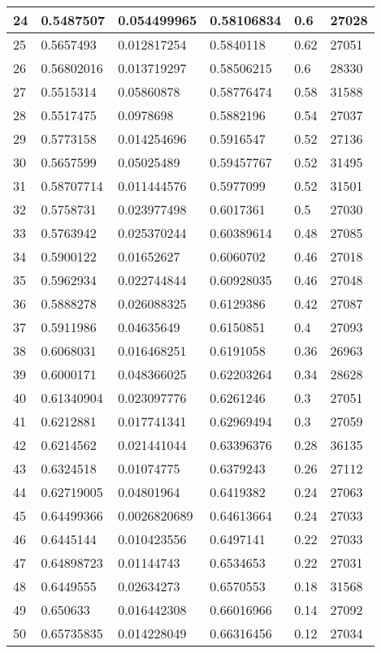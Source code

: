 \begin{longtable}{|l|l|l|l|l|l|}
24 & 0.5487507 & 0.054499965 & 0.58106834 & 0.6 & 27028 \\ \hline 
25 & 0.5657493 & 0.012817254 & 0.5840118 & 0.62 & 27051 \\ \hline 
26 & 0.56802016 & 0.013719297 & 0.58506215 & 0.6 & 28330 \\ \hline 
27 & 0.5515314 & 0.05860878 & 0.58776474 & 0.58 & 31588 \\ \hline 
28 & 0.5517475 & 0.0978698 & 0.5882196 & 0.54 & 27037 \\ \hline 
29 & 0.5773158 & 0.014254696 & 0.5916547 & 0.52 & 27136 \\ \hline 
30 & 0.5657599 & 0.05025489 & 0.59457767 & 0.52 & 31495 \\ \hline 
31 & 0.58707714 & 0.011444576 & 0.5977099 & 0.52 & 31501 \\ \hline 
32 & 0.5758731 & 0.023977498 & 0.6017361 & 0.5 & 27030 \\ \hline 
33 & 0.5763942 & 0.025370244 & 0.60389614 & 0.48 & 27085 \\ \hline 
34 & 0.5900122 & 0.01652627 & 0.6060702 & 0.46 & 27018 \\ \hline 
35 & 0.5962934 & 0.022744844 & 0.60928035 & 0.46 & 27048 \\ \hline 
36 & 0.5888278 & 0.026088325 & 0.6129386 & 0.42 & 27087 \\ \hline 
37 & 0.5911986 & 0.04635649 & 0.6150851 & 0.4 & 27093 \\ \hline 
38 & 0.6068031 & 0.016468251 & 0.6191058 & 0.36 & 26963 \\ \hline 
39 & 0.6000171 & 0.048366025 & 0.62203264 & 0.34 & 28628 \\ \hline 
40 & 0.61340904 & 0.023097776 & 0.6261246 & 0.3 & 27051 \\ \hline 
41 & 0.6212881 & 0.017741341 & 0.62969494 & 0.3 & 27059 \\ \hline 
42 & 0.6214562 & 0.021441044 & 0.63396376 & 0.28 & 36135 \\ \hline 
43 & 0.6324518 & 0.01074775 & 0.6379243 & 0.26 & 27112 \\ \hline 
44 & 0.62719005 & 0.04801964 & 0.6419382 & 0.24 & 27063 \\ \hline 
45 & 0.64499366 & 0.0026820689 & 0.64613664 & 0.24 & 27033 \\ \hline 
46 & 0.6445144 & 0.010423556 & 0.6497141 & 0.22 & 27033 \\ \hline 
47 & 0.64898723 & 0.01144743 & 0.6534653 & 0.22 & 27031 \\ \hline 
48 & 0.6449555 & 0.02634273 & 0.6570553 & 0.18 & 31568 \\ \hline 
49 & 0.650633 & 0.016442308 & 0.66016966 & 0.14 & 27092 \\ \hline 
50 & 0.65735835 & 0.014228049 & 0.66316456 & 0.12 & 27034 \\ \hline 
\end{longtable}